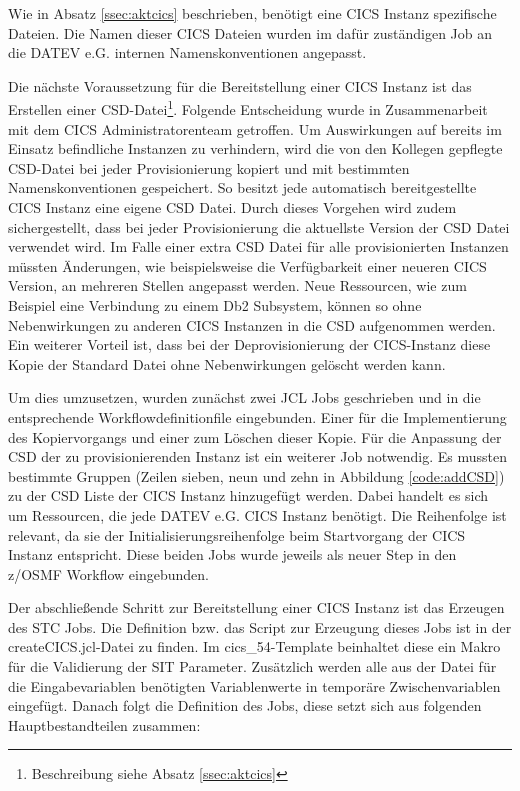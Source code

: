 Wie in Absatz \ref{ssec:aktcics} beschrieben, benötigt eine CICS Instanz spezifische Dateien.
Die Namen dieser CICS Dateien wurden im dafür zuständigen Job an die DATEV e.G. internen Namenskonventionen angepasst.

Die nächste Voraussetzung für die Bereitstellung einer CICS Instanz ist das Erstellen einer CSD-Datei\footnote{Beschreibung siehe Absatz \ref{ssec:aktcics}}.
Folgende Entscheidung wurde in Zusammenarbeit mit dem CICS Administratorenteam getroffen.
Um Auswirkungen auf bereits im Einsatz befindliche Instanzen zu verhindern, wird die von den Kollegen gepflegte CSD-Datei bei jeder Provisionierung kopiert und mit bestimmten Namenskonventionen gespeichert.
So besitzt jede automatisch bereitgestellte CICS Instanz eine eigene CSD Datei.
Durch dieses Vorgehen wird zudem sichergestellt, dass bei jeder Provisionierung die aktuellste Version der CSD Datei verwendet wird.
Im Falle einer extra CSD Datei für alle provisionierten Instanzen müssten Änderungen, wie beispielsweise die Verfügbarkeit einer neueren CICS Version, an mehreren Stellen angepasst werden.
Neue Ressourcen, wie zum Beispiel eine Verbindung zu einem Db2 Subsystem, können so ohne Nebenwirkungen zu anderen CICS Instanzen in die CSD aufgenommen werden.
Ein weiterer Vorteil ist, dass bei der Deprovisionierung der CICS-Instanz diese Kopie der Standard Datei ohne Nebenwirkungen gelöscht werden kann.

Um dies umzusetzen, wurden zunächst zwei JCL Jobs geschrieben und in die entsprechende Workflowdefinitionfile eingebunden.
Einer für die Implementierung des Kopiervorgangs und einer zum Löschen dieser Kopie.
Für die Anpassung der CSD der zu provisionierenden Instanz ist ein weiterer Job notwendig.
Es mussten bestimmte Gruppen (Zeilen sieben, neun und zehn in Abbildung \ref{code:addCSD}) zu der CSD Liste der CICS Instanz hinzugefügt werden.
Dabei handelt es sich um Ressourcen, die jede DATEV e.G. CICS Instanz benötigt.
Die Reihenfolge ist relevant, da sie der Initialisierungsreihenfolge beim Startvorgang der CICS Instanz entspricht.
Diese beiden Jobs wurde jeweils als neuer Step in den z/OSMF Workflow eingebunden.

\begin{minipage}{\linewidth}

\end{minipage}

Der abschließende Schritt zur Bereitstellung einer CICS Instanz ist das Erzeugen des STC Jobs.
Die Definition bzw. das Script zur Erzeugung dieses Jobs ist in der \glqq createCICS.jcl\grqq-Datei zu finden.
Im \glqq cics\_54\grqq-Template beinhaltet diese ein Makro für die Validierung der SIT Parameter.
Zusätzlich werden alle aus der Datei für die Eingabevariablen benötigten Variablenwerte in temporäre Zwischenvariablen eingefügt.
Danach folgt die Definition des Jobs, diese setzt sich aus folgenden Hauptbestandteilen zusammen:

